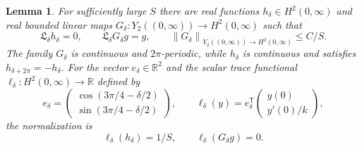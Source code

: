 \documentclass[11pt,a4paper]{article}
\newtheorem{lemma}{Lemma}
\newcommand{\R}{\mathbb R}
\newcommand{\norm}[1]{\left\lVert#1\right\rVert}
\begin{document}
\begin{lemma}\label{lem:scalar}
For sufficiently large $S$ there are real functions
$h_\delta\in H^2(0,\infty)$ and real bounded linear maps
$G_\delta:Y_2((0,\infty))\to H^2(0,\infty)$ such that
\[
 \mathfrak L_\delta h_\delta=0,\qquad
 \mathfrak L_\delta G_\delta g=g,\qquad
 \norm{G_\delta}_{Y_2((0,\infty))\to H^2(0,\infty)}\le C/S.
\]
The family $G_\delta$ is continuous and $2\pi$-periodic, while
$h_\delta$ is continuous and satisfies $h_{\delta+2\pi}=-h_\delta$.
For the vector $e_\delta\in\R^2$ and the scalar trace functional
$\ell_\delta:H^2(0,\infty)\to\R$ defined by
\[
 e_\delta=
 \begin{pmatrix}\cos(3\pi/4-\delta/2)\\
                 \sin(3\pi/4-\delta/2)\end{pmatrix},
 \qquad
 \ell_\delta(y)=e_\delta^{\mathsf T}
            \begin{pmatrix}y(0)\\y'(0)/k\end{pmatrix},
\]
the normalization is
\begin{equation}\label{eq:normalization}
 \ell_\delta(h_\delta)=1/S,\qquad
 \ell_\delta(G_\delta g)=0.
\end{equation}
\end{lemma}
\end{document}
